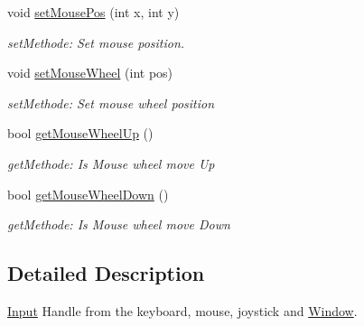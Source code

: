 \begin{DoxyCompactItemize}
void \hyperlink{class_f2_c_1_1_input_a04fd09840025c2d60e483a1d0127255b}{setMousePos} (int x, int y)
\begin{DoxyCompactList}\small\item\em setMethode: Set mouse position. \item\end{DoxyCompactList}\item 
void \hyperlink{class_f2_c_1_1_input_ab28d56430cadbe95356fd30ca5abead6}{setMouseWheel} (int pos)
\begin{DoxyCompactList}\small\item\em setMethode: Set mouse wheel position \item\end{DoxyCompactList}\item 
\hypertarget{class_f2_c_1_1_input_a74a2b9d3acccf2748e51815861a05579}{
bool \hyperlink{class_f2_c_1_1_input_a74a2b9d3acccf2748e51815861a05579}{getMouseWheelUp} ()}
\label{class_f2_c_1_1_input_a74a2b9d3acccf2748e51815861a05579}

\begin{DoxyCompactList}\small\item\em getMethode: Is Mouse wheel move Up \item\end{DoxyCompactList}\item 
\hypertarget{class_f2_c_1_1_input_ac190809de1aded129b1780ff1df73043}{
bool \hyperlink{class_f2_c_1_1_input_ac190809de1aded129b1780ff1df73043}{getMouseWheelDown} ()}
\label{class_f2_c_1_1_input_ac190809de1aded129b1780ff1df73043}

\begin{DoxyCompactList}\small\item\em getMethode: Is Mouse wheel move Down \item\end{DoxyCompactList}\end{DoxyCompactItemize}


\subsection{Detailed Description}
\hyperlink{class_f2_c_1_1_input}{Input} Handle from the keyboard, mouse, joystick and \hyperlink{class_f2_c_1_1_window}{Window}. 


